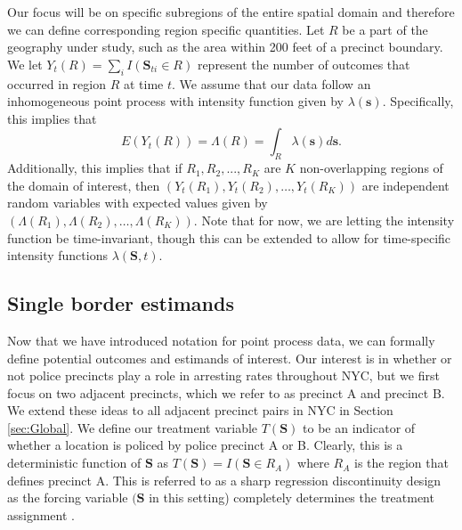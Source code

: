 \documentclass[a4paper,11pt]{article}
\begin{document}
Our focus will be on specific subregions of the entire spatial domain and therefore we can define corresponding region specific quantities. Let $R$ be a part of the geography under study, such as the area within 200 feet of a precinct boundary. We let $Y_t(R) = \sum_{i} I(\boldsymbol{S}_{ti} \in R)$ represent the number of outcomes that occurred in region $R$ at time $t$. We assume that our data follow an inhomogeneous point process \citep{daley2003introduction} with intensity function given by $\lambda(\boldsymbol{s})$. Specifically, this implies that $$E(Y_t(R)) = \Lambda(R) = \int_R \lambda(\boldsymbol{s}) d \boldsymbol{s}.$$
Additionally, this implies that if $R_1, R_2,..., R_K$ are $K$ non-overlapping regions of the domain of interest, then $(Y_t(R_1), Y_t(R_2), \dots, Y_t(R_K))$ are independent random variables with expected values given by $(\Lambda(R_1), \Lambda(R_2), \dots, \Lambda(R_K)).$ Note that for now, we are letting the intensity function be time-invariant, though this can be extended to allow for time-specific intensity functions $\lambda(\boldsymbol{S}, t)$. 

\subsection{Single border estimands}

Now that we have introduced notation for point process data, we can formally define potential outcomes and estimands of interest. Our interest is in whether or not police precincts play a role in arresting rates throughout NYC, but we first focus on two adjacent precincts, which we refer to as precinct A and precinct B. We extend these ideas to all adjacent precinct pairs in NYC in Section \ref{sec:Global}. We define our treatment variable $T(\boldsymbol{S})$ to be an indicator of whether a location is policed by police precinct A or B. Clearly, this is a deterministic function of $\boldsymbol{S}$ as $T(\boldsymbol{S}) = I(\boldsymbol{S} \in R_A)$ where $R_A$ is the region that defines precinct A. This is referred to as a sharp regression discontinuity design as the forcing variable $(\boldsymbol{S}$ in this setting) completely determines the treatment assignment \citep{trochim1990regression}. 
\end{document}

